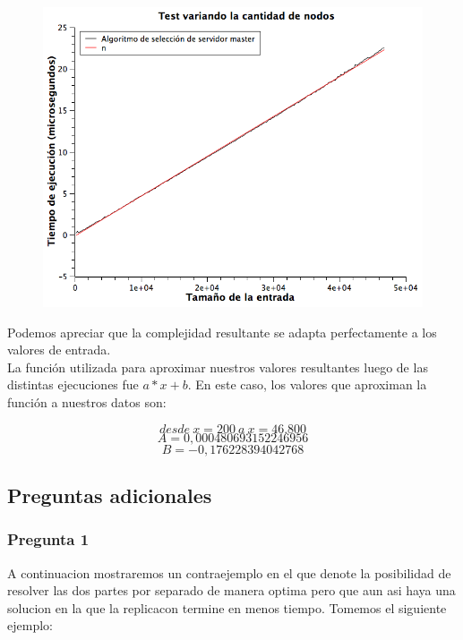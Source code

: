 \begin{figure}[H]
\begin{center}
	\includegraphics[width=350pt]{../tests/ej2/EJ2-nodo-var.png}
\end{center}
\end{figure}

Podemos apreciar que la complejidad resultante se adapta perfectamente a los valores de entrada.\\

La función utilizada para aproximar nuestros valores resultantes luego de las distintas ejecuciones fue $a*x+b$.
En este caso, los valores que aproximan la función a nuestros datos son:

$$desde\ x = 200\ a\ x = 46.800$$
$$A  = 0,000480693152246956$$
$$B  = -0,176228394042768$$


\subsection{Preguntas adicionales}


\subsubsection{Pregunta 1}
A continuacion mostraremos un contraejemplo en el que denote la posibilidad de resolver las dos partes por separado de manera optima pero que aun asi haya una solucion en la que la replicacon termine en menos tiempo. \newline
\newline
Tomemos el siguiente ejemplo:\newline

